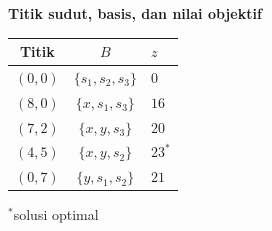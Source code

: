 \begin{center}
\begin{minipage}[c]{0.40\linewidth}
\medskip
\textbf{Titik sudut, basis, dan nilai objektif}\par\smallskip
\renewcommand{\arraystretch}{1.16}%
\begin{tabular}{@{}ccl@{}}
  \textbf{Titik} & \textbf{$B$} & \textbf{$z$}\\ \hline
  $(0,0)$ & $\{s_1,s_2,s_3\}$ & $0$\\
  $(8,0)$ & $\{x,s_1,s_3\}$   & $16$\\
  $(7,2)$ & $\{x,y,s_3\}$     & $20$\\
  $(4,5)$ & $\{x,y,s_2\}$     & $23^{\ast}$\\
  $(0,7)$ & $\{y,s_1,s_2\}$   & $21$
\end{tabular}

\smallskip
$^{\ast}$solusi optimal
\end{minipage}
\par{}\label{fig:simplex-basis-driven-tikz08}%

\end{center}

